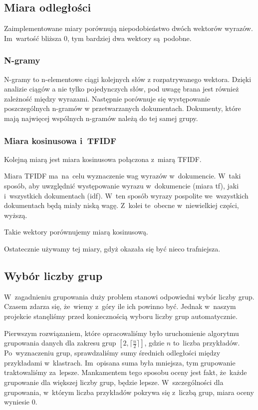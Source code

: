 \documentclass[a4paper,12pt]{mwart}
\begin{document}
\subsection{Miara odległości}

Zaimplementowane miary porównują niepodobieństwo dwóch wektorów wyrazów.
Im~wartość bliższa 0, tym bardziej dwa wektory są~podobne.

\subsubsection{N-gramy}
N-gramy to n-elementowe ciągi kolejnych słów z rozpatrywanego wektora. Dzięki
analizie ciągów a nie tylko pojedynczych słów, pod uwagę brana jest również
zależność między wyrazami. Następnie porównuje się występowanie poszczególnych
n-gramów w przetwarzanych dokumentach. Dokumenty, które mają najwięcej wspólnych
n-gramów należą do tej samej grupy.

\subsubsection{Miara kosinusowa i~TFIDF}

Kolejną miarą jest miara kosinusowa połączona z~miarą TFIDF.

Miara TFIDF ma~na~celu wyznaczenie wag wyrazów w~dokumencie. W~taki sposób, aby
uwzględnić występowanie wyrazu w~dokumencie (miara tf), jaki i~wszystkich
dokumentach (idf). W~ten sposób wyrazy pospolite we~wszystkich dokumentach będą
miały niską wagę. Z~kolei te~obecne w~niewielkiej części, wyższą.

Takie wektory porównujemy miarą kosinusową.

Ostatecznie używamy tej miary, gdyż okazała się być nieco trafniejsza.

\subsection{Wybór liczby grup}

W~zagadnieniu grupowania duży problem stanowi odpowiedni wybór liczby grup.
Czasem zdarza się, że~wiemy z~góry ile ich powinno być. Jednak w~naszym
projekcie stanęliśmy przed koniecznością wyboru liczby grup automatycznie.

Pierwszym rozwiązaniem, które opracowaliśmy było uruchomienie algorytmu
grupowania danych dla zakresu grup $[2, \lceil \frac{n}{2} \rceil]$, gdzie $n$
to~liczba przykładów. Po~wyznaczeniu grup, sprawdzaliśmy sumy średnich
odległości między przykładami w~klastrach. Im~opisana suma była mniejsza, tym
grupowanie traktowaliśmy za~lepsze. Mankamentem tego sposobu oceny jest fakt,
że~każde grupowanie dla większej liczby grup, będzie lepsze. W~szczególności
dla grupowania, w~którym liczba przykładów pokrywa się z~liczbą grup, miara
oceny wyniesie $0$.
\end{document}
